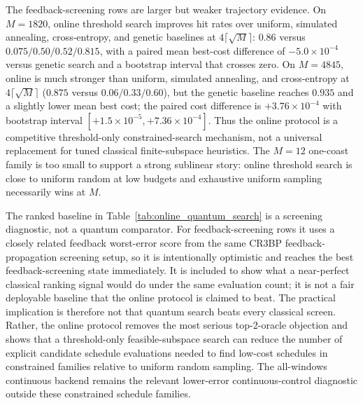\documentclass[preprint,12pt]{elsarticle}
\begin{document}
The feedback-screening rows are larger but weaker trajectory evidence. On $M=1820$, online threshold search improves hit rates over uniform, simulated annealing, cross-entropy, and genetic baselines at $4\lceil\sqrt{M}\rceil$: $0.86$ versus $0.075/0.50/0.52/0.815$, with a paired mean best-cost difference of $-5.0\times10^{-4}$ versus genetic search and a bootstrap interval that crosses zero. On $M=4845$, online is much stronger than uniform, simulated annealing, and cross-entropy at $4\lceil\sqrt{M}\rceil$ ($0.875$ versus $0.06/0.33/0.60$), but the genetic baseline reaches $0.935$ and a slightly lower mean best cost; the paired cost difference is $+3.76\times10^{-4}$ with bootstrap interval $[+1.5\times10^{-5},+7.36\times10^{-4}]$. Thus the online protocol is a competitive threshold-only constrained-search mechanism, not a universal replacement for tuned classical finite-subspace heuristics. The $M=12$ one-coast family is too small to support a strong sublinear story: online threshold search is close to uniform random at low budgets and exhaustive uniform sampling necessarily wins at $M$.

The ranked baseline in Table~\ref{tab:online_quantum_search} is a screening diagnostic, not a quantum comparator. For feedback-screening rows it uses a closely related feedback worst-error score from the same CR3BP feedback-propagation screening setup, so it is intentionally optimistic and reaches the best feedback-screening state immediately. It is included to show what a near-perfect classical ranking signal would do under the same evaluation count; it is not a fair deployable baseline that the online protocol is claimed to beat. The practical implication is therefore not that quantum search beats every classical screen. Rather, the online protocol removes the most serious top-2-oracle objection and shows that a threshold-only feasible-subspace search can reduce the number of explicit candidate schedule evaluations needed to find low-cost schedules in constrained families relative to uniform random sampling. The all-windows continuous backend remains the relevant lower-error continuous-control diagnostic outside these constrained schedule families.
\end{document}
